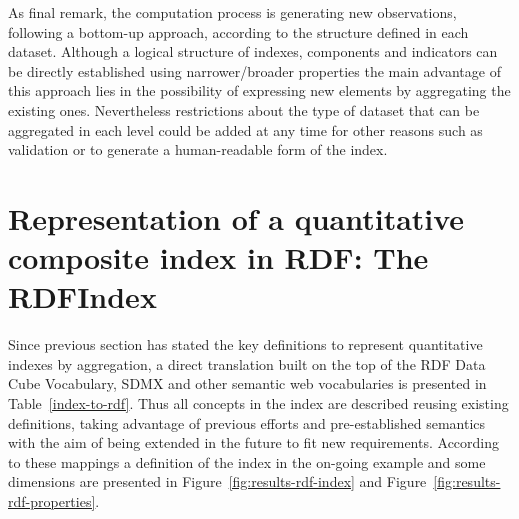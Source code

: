 As final remark, the computation process is generating new observations, following a bottom-up approach, according to the structure defined 
in each dataset. Although a logical structure of indexes, components and indicators can be directly established using narrower/broader properties 
the main advantage of this approach lies in the possibility of expressing new elements by aggregating the existing ones. Nevertheless restrictions 
about the type of dataset that can be aggregated in each level could be added at any time for other reasons such as validation or to generate 
a human-readable form of the index.


\section{Representation of a quantitative composite index in RDF: The RDFIndex}
Since previous section has stated the key definitions to represent quantitative indexes by aggregation, a direct translation built 
on the top of the RDF Data Cube Vocabulary, SDMX and other semantic web vocabularies is presented in Table~\ref{index-to-rdf}. Thus 
all concepts in the index are described reusing existing definitions, taking advantage of previous efforts and pre-established semantics 
with the aim of being extended in the future to fit new requirements. According to these mappings a definition of the index in the 
on-going example and some dimensions are presented in Figure~\ref{fig:results-rdf-index} and Figure~\ref{fig:results-rdf-properties}.


